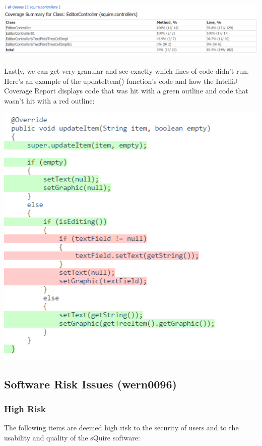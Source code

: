 \documentclass[twoside,letterpaper]{article}
\begin{document}
\noindent\includegraphics[width=\textwidth]{images/TestPlan/EditorControllerCoverage} 

\noindent Lastly, we can get very granular and see exactly which lines of code didn't run. Here's an example of the updateItem() function's code and how the IntelliJ Coverage Report displays code that was hit with a green outline and code that wasn't hit with a red outline:

\noindent\includegraphics[scale=0.7]{images/TestPlan/EditorControllerCoverageFunction}


\newpage
\subsection{Software Risk Issues (wern0096)}

\subsubsection{High Risk}

The following items are deemed high risk to the security of users and to the usability and quality of the sQuire software:
\end{document}
